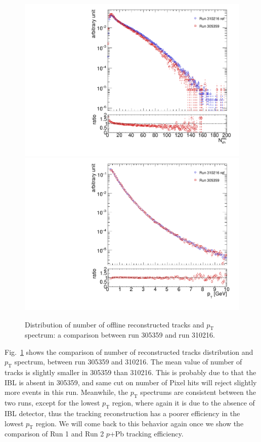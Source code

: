 \begin{figure}[H]
\centering
\includegraphics[width=0.45\linewidth]{figs/sec_evtSlc/GRLpp2016/305359_dis_nTrk.pdf}
\includegraphics[width=0.45\linewidth]{figs/sec_evtSlc/GRLpp2016/305359_dis_pt.pdf}
\caption{Distribution of number of offline reconstructed tracks and $p_{\text{T}}$ spectrum: a comparison between run 305359 and run 310216.}
\label{fig:GRLpp2016_305359_nTrk_pt}
\end{figure}
Fig.~\ref{fig:GRLpp2016_305359_nTrk_pt} shows the comparison of number of reconstructed tracks distribution and $p_{\text{T}}$ spectrum, between run 305359 and 310216. The mean value of number of tracks is slightly smaller in 305359 than 310216. This is probably due to that the IBL is absent in 305359, and same cut on number of Pixel hits will reject slightly more events in this run. Meanwhile, the $p_{\text{T}}$ spectrums are consistent between the two runs, except for the lowest $p_{\text{T}}$ region, where again it is due to the absence of IBL detector, thus the tracking reconstruction has a poorer efficiency in the lowest $p_{\text{T}}$ region. We will come back to this behavior again once we show the comparison of Run 1 and Run 2 $p$+Pb tracking efficiency.

